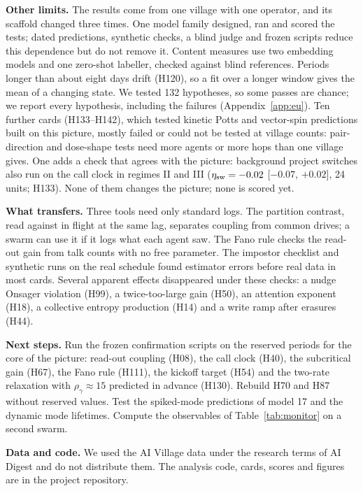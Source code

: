 \textbf{Other limits.} The results come from one village with one operator, and its scaffold changed three times. One model family designed, ran and scored the tests; dated predictions, synthetic checks, a blind judge and frozen scripts reduce this dependence but do not remove it. Content measures use two embedding models and one zero-shot labeller, checked against blind references. Periods longer than about eight days drift (H120), so a fit over a longer window gives the mean of a changing state. We tested 132 hypotheses, so some passes are chance; we report every hypothesis, including the failures (Appendix~\ref{app:eu}). Ten further cards (H133--H142), which tested kinetic Potts and vector-spin predictions built on this picture, mostly failed or could not be tested at village counts: pair-direction and dose-shape tests need more agents or more hops than one village gives. One adds a check that agrees with the picture: background project switches also run on the call clock in regimes II and III ($\eta_{\rm sw}=-0.02$ [$-0.07$, $+0.02$], 24 units; H133). None of them changes the picture; none is scored yet.

\textbf{What transfers.} Three tools need only standard logs. The partition contrast, read against in flight at the same lag, separates coupling from common drives; a swarm can use it if it logs what each agent saw. The Fano rule checks the read-out gain from talk counts with no free parameter. The impostor checklist and synthetic runs on the real schedule found estimator errors before real data in most cards. Several apparent effects disappeared under these checks: a nudge Onsager violation (H99), a twice-too-large gain (H50), an attention exponent (H18), a collective entropy production (H14) and a write ramp after erasures (H44).

\textbf{Next steps.} Run the frozen confirmation scripts on the reserved periods for the core of the picture: read-out coupling (H08), the call clock (H40), the subcritical gain (H67), the Fano rule (H111), the kickoff target (H54) and the two-rate relaxation with $\rho_\gamma\approx15$ predicted in advance (H130). Rebuild H70 and H87 without reserved values. Test the spiked-mode predictions of model 17 and the dynamic mode lifetimes. Compute the observables of Table~\ref{tab:monitor} on a second swarm.

\textbf{Data and code.} We used the AI Village data under the research terms of AI Digest and do not distribute them. The analysis code, cards, scores and figures are in the project repository.
